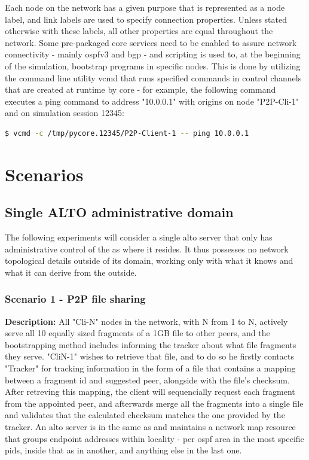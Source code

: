     Each node on the network has a given purpose that is represented as a node label, and link labels are used to specify connection properties.
    Unless stated otherwise with these labels, all other properties are equal throughout the network.
    Some pre-packaged \gls{core} services need to be enabled to assure network connectivity - mainly \gls{ospfv3} and \gls{bgp} - and scripting is used to, at the beginning of the simulation, bootstrap programs in specific nodes.
    This is done by utilizing the command line utility vcmd that runs specified commands in control channels that are created at runtime by \gls{core} - for example, the following command executes a ping command to address "10.0.0.1" with origins on node "P2P-Cli-1" and on simulation session 12345:

    \begin{center}
    \begin{lstlisting}[caption=Execution of an example command through the control channel of a given node, language=bash]
$ vcmd -c /tmp/pycore.12345/P2P-Client-1 -- ping 10.0.0.1
    \end{lstlisting}
    \end{center}

\section{Scenarios}

\subsection{Single ALTO administrative domain}

    The following experiments will consider a single \gls{alto} server that only has administrative control of the \gls{as} where it resides.
    It thus possesses no network topological details outside of its domain, working only with what it knows and what it can derive from the outside.

\subsubsection{Scenario 1 - P2P file sharing}
\textbf{Description:} All "Cli-N" nodes in the network, with N from 1 to N, actively serve all 10 equally sized fragments of a 1GB file to other peers, and the bootstrapping method includes informing the tracker about what file fragments they serve.
    "CliN-1" wishes to retrieve that file, and to do so he firstly contacts "Tracker" for tracking information in the form of a file that contains a mapping between a fragment \gls{id} and suggested peer, alongside with the file's checksum.
    After retreving this mapping, the client will sequencially request each fragment from the appointed peer, and afterwards merge all the fragments into a single file and validates that the calculated checksum matches the one provided by the tracker.
    An \gls{alto} server is in the same \gls{as} and maintains a network map resource that groups endpoint addresses within locality - per \gls{ospf} area in the most specific pids, inside that \gls{as} in another, and anything else in the last one.


